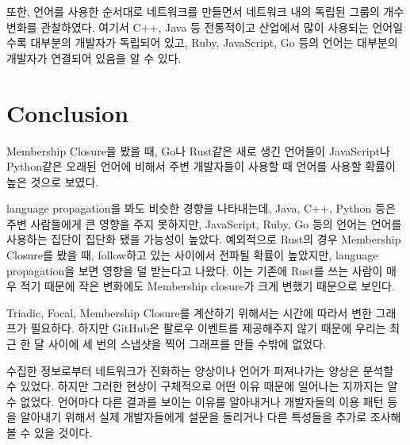 \documentclass[10pt, a4paper, titlepage]{article}
\begin{document}
또한, 언어를 사용한 순서대로 네트워크를 만들면서 네트워크 내의 독립된 그룹의 개수 변화를 관찰하였다. 여기서 C++, Java 등 전통적이고 산업에서 많이 사용되는 언어일수록 대부분의 개발자가 독립되어 있고, Ruby, JavaScript, Go 등의 언어는 대부분의 개발자가 연결되어 있음을 알 수 있다.


\section{Conclusion}

Membership Closure을 봤을 때, Go나 Rust같은 새로 생긴 언어들이 JavaScript나 Python같은 오래된 언어에 비해서 주변 개발자들이 사용할 때 언어를 사용할 확률이 높은 것으로 보였다.

language propagation을 봐도 비슷한 경향을 나타내는데, Java, C++, Python 등은 주변 사람들에게 큰 영향을 주지 못하지만, JavaScript, Ruby, Go 등의 언어는 언어를 사용하는 집단이 집단화 됐을 가능성이 높았다. 예외적으로 Rust의 경우 Membership Closure를 봤을 때, follow하고 있는 사이에서 전파될 확률이 높았지만, language propagation을 보면 영향을 덜 받는다고 나왔다. 이는 기존에 Rust를 쓰는 사람이 매우 적기 때문에 작은 변화에도 Membership closure가 크게 변했기 때문으로 보인다.

Triadic, Focal, Membership Closure를 계산하기 위해서는 시간에 따라서 변한 그래프가 필요하다. 하지만 GitHub은 팔로우 이벤트를 제공해주지 않기 때문에 우리는 최근 한 달 사이에 세 번의 스냅샷을 찍어 그래프를 만들 수밖에 없었다. 

수집한 정보로부터 네트워크가 진화하는 양상이나 언어가 퍼져나가는 양상은 분석할 수 있었다. 하지만 그러한 현상이 구체적으로 어떤 이유 때문에 일어나는 지까지는 알 수 없었다. 언어마다 다른 결과를 보이는 이유를 알아내거나 개발자들의 이용 패턴 등을 알아내기 위해서 실제 개발자들에게 설문을 돌리거나 다른 특성들을 추가로 조사해볼 수 있을 것이다.
\end{document}
